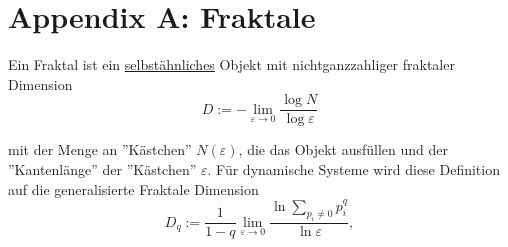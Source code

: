 \documentclass{article}
\newcommand{\lr}[1]{\left(#1\right)}
\begin{document}
%
%			
%		
%		
%		


\newpage


\section{Appendix A: Fraktale}
Ein Fraktal ist ein \underline{selbstähnliches} Objekt mit nichtganzzahliger fraktaler Dimension
	\begin{equation}
		D := - \lim_{\varepsilon \to 0} \frac{\log N}{\log \varepsilon}
	\end{equation}

mit der Menge an ''Kästchen'' $N(\varepsilon)$, die das Objekt ausfüllen und der ''Kantenlänge'' der ''Kästchen'' $\varepsilon$. Für dynamische Systeme wird diese Definition auf die generalisierte Fraktale Dimension
	\begin{equation}
		D_q := \frac{1}{1-q} \lim_{\varepsilon \to 0} \frac{\ln \sum_{p_i \neq 0} p_i^q}{\ln\varepsilon},
	\end{equation}
\end{document}
